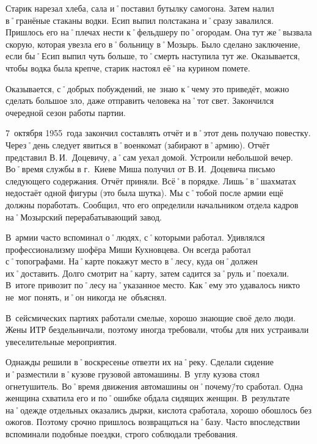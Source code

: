 Старик нарезал хлеба, сала и˚поставил бутылку самогона. Затем налил в˚гранёные стаканы водки. Есип выпил полстакана и˚сразу завалился. Пришлось его на˚плечах нести к˚фельдшеру по˚огородам. Она тут же˚вызвала скорую, которая увезла его в˚больницу в˚Мозырь. Было сделано заключение, если бы˚Есип выпил чуть больше, то˚смерть наступила тут же. Оказывается, чтобы водка была крепче, старик настоял её˚на курином помете.

Оказывается, с˚добрых побуждений, не~знаю к˚чему это приведёт, можно сделать большое зло, даже отправить человека на˚тот свет. Закончился очередной сезон работы партии.

7~октября 1955~года закончил составлять отчёт и в˚этот день получаю повестку. Через˚день следует явиться в˚военкомат (забирают в˚армию). Отчёт представил В.\,И.~Доцевичу, а˚сам уехал домой. Устроили небольшой вечер. Во˚время службы в г.~Киеве Миша получил от В.\,И.~Доцевича письмо следующего содержания. Отчёт приняли. Всё˚в порядке. Лишь˚в˚шахматах недостаёт одной фигуры (это была шутка). Мы с˚тобой после армии ещё должны поработать. Сообщил, что его определили начальником отдела кадров на˚Мозырский перерабатывающий завод.

В~армии часто вспоминал о˚людях, с˚которыми работал. Удивлялся профессионализму шофёра Миши Кухновцева. Он всегда работал с˚топографами. На˚карте покажут место в˚лесу, куда он˚должен их˚доставить. Долго смотрит на˚карту, затем садится за˚руль и˚поехали. В~итоге привозит по˚лесу на˚указанное место. Как˚ему это удавалось никто не~мог понять, и˚он никогда не~объяснял.

В~сейсмических партиях работали смелые, хорошо знающие своё дело люди. Жены ИТР бездельничали, поэтому иногда требовали, чтобы для них устраивали увеселительные мероприятия.

Однажды решили в˚воскресенье отвезти их на˚реку. Сделали сидение и˚разместили в˚кузове грузовой автомашины. В~углу кузова стоял огнетушитель. Во˚время движения автомашины он˚почему\=/то сработал. Одна женщина схватила его и по˚ошибке обдала сидящих женщин. В~результате на˚одежде отдельных оказались дырки, кислота сработала, хорошо обошлось без ожогов. Поэтому срочно пришлось возвращаться на˚базу. Часто впоследствии вспоминали подобные поездки, строго соблюдали требования.